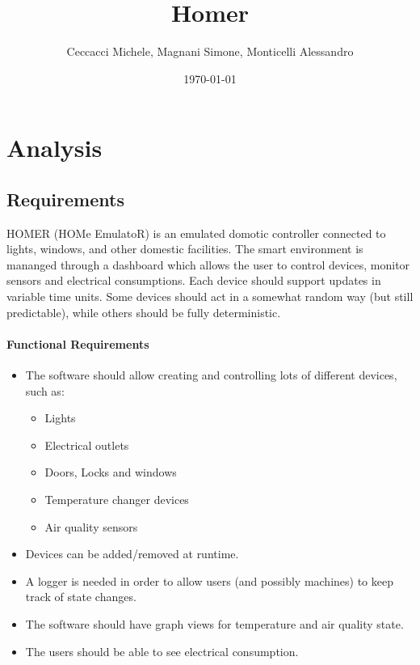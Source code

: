 \documentclass[a4paper,12pt]{report}
\title{Homer}
\author{Ceccacci Michele, Magnani Simone, Monticelli Alessandro}
\date{\today}
\begin{document}
\maketitle

\begin{abstract}
\end{abstract}

\tableofcontents

\chapter{Analysis}
\section{Requirements}

HOMER (HOMe EmulatoR) is an emulated domotic controller connected to lights, windows, and other domestic facilities.
The smart environment is mananged through a dashboard which allows the user to control devices, monitor sensors and electrical consumptions.
Each device should support updates in variable time units.
Some devices should act in a somewhat random way (but still predictable), while others should be fully deterministic.

\subsubsection{Functional Requirements}

\begin{itemize}
	\item The software should allow creating and controlling lots of different devices, such as:
	\begin{itemize}
		\item Lights
		\item Electrical outlets
		\item Doors, Locks and windows
		\item Temperature changer devices
		\item Air quality sensors
	\end{itemize}
	\item Devices can be added/removed at runtime.
	\item A logger is needed in order to allow users (and possibly machines) to keep track of state changes.
	\item The software should have graph views for temperature and air quality state.
	\item The users should be able to see electrical consumption.
\end{itemize}
\end{document}
